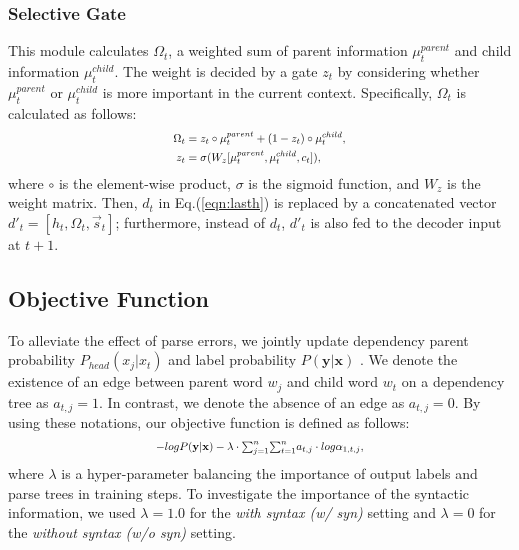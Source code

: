 \documentclass[letterpaper]{article} \usepackage{aaai20}  \usepackage{times}  \usepackage{helvet} \usepackage{courier}  \usepackage[hyphens]{url}  \usepackage{graphicx} \urlstyle{rm} \def\UrlFont{\rm}  \usepackage{graphicx}  \frenchspacing  \setlength{\pdfpagewidth}{8.5in}  \setlength{\pdfpageheight}{11in}  \usepackage{tabu}
\begin{document}
\subsubsection{Selective Gate}
This module calculates $\Omega_{t}$, a weighted sum of parent information $\mu^{parent}_{t}$ and child information $\mu^{child}_{t}$. The weight is decided by a gate $z_{t}$ by considering whether $\mu^{parent}_{t}$ or $\mu^{child}_{t}$ is more important in the current context.
Specifically, $\Omega_{t}$ is calculated as follows:
\begin{equation}
\scalebox{0.8}{$
\begin{aligned}
    \Omega_{t} &= z_{t} \circ \mu^{parent}_{t} + (1-z_{t}) \circ \mu^{child}_{t}, \label{eqn:gate}\\
    z_{t} &= \sigma(W_{z}[\mu^{parent}_{t},\mu^{child}_{t},c_{t}]),
\end{aligned}
$}
\end{equation}
where $\circ$ is the element-wise product, $\sigma$ is the sigmoid function, and $W_{z}$ is the weight matrix.
Then, $d_{t}$ in Eq.(\ref{eqn:lasth}) is replaced by a concatenated vector $d'_{t} = [ h_{t}, \Omega_{t}, \overrightarrow{s}_{t} ]$; furthermore, instead of $d_{t}$, $d'_{t}$ is also fed to the decoder input at $t+1$. 

\subsection{Objective Function}
\label{sec:objfunc}
To alleviate the effect of parse errors, we jointly update dependency parent probability $P_{head}(x_{j}|x_{t})$ and label probability $P(\mathbf{y}|\mathbf{x})$ \cite{kamigaito-etal-2017-supervised}.
We denote the existence of an edge between parent word $w_{j}$ and child word $w_{t}$ on a dependency tree as $a_{t,j}=1$.
In contrast, we denote the absence of an edge as $a_{t,j}=0$. By using these notations, our objective function is defined as follows:
\begin{equation}
\scalebox{0.8}{$
-log P(\mathbf{y}|\mathbf{x}) -\lambda \cdot {\textstyle\sum}_{j=1}^{n} {\textstyle\sum}_{t=1}^{n} a_{t,j} \cdot log \alpha_{1,t,j},
$}
\label{eqn:sup}
\end{equation}
where $\lambda$ is a hyper-parameter balancing the importance of output labels and parse trees in training steps.
To investigate the importance of the syntactic information, we used $\lambda=1.0$ for the \textit{with syntax (w/ syn)} setting and $\lambda=0$ for the \textit{without syntax (w/o syn)} setting.
\end{document}
